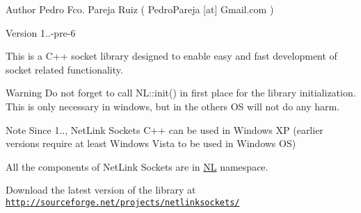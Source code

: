 \begin{DoxyAuthor}{Author}
Pedro Fco. Pareja Ruiz ( Pedro\+Pareja \mbox{[}at\mbox{]} Gmail.\+com ) 
\end{DoxyAuthor}
\begin{DoxyVersion}{Version}
1..-\/pre-\/6
\end{DoxyVersion}
This is a C++ socket library designed to enable easy and fast development of socket related functionality.

\begin{DoxyWarning}{Warning}
Do not forget to call N\+L\+::init() in first place for the library initialization. This is only necessary in windows, but in the others O\+S will not do any harm.
\end{DoxyWarning}
\begin{DoxyNote}{Note}
Since 1.., Net\+Link Sockets C++ can be used in Windows X\+P (earlier versions require at least Windows Vista to be used in Windows O\+S)
\end{DoxyNote}
All the components of Net\+Link Sockets are in \hyperlink{namespaceNL}{N\+L} namespace.

Download the latest version of the library at \href{http://sourceforge.net/projects/netlinksockets/}{\tt http\+://sourceforge.\+net/projects/netlinksockets/}

